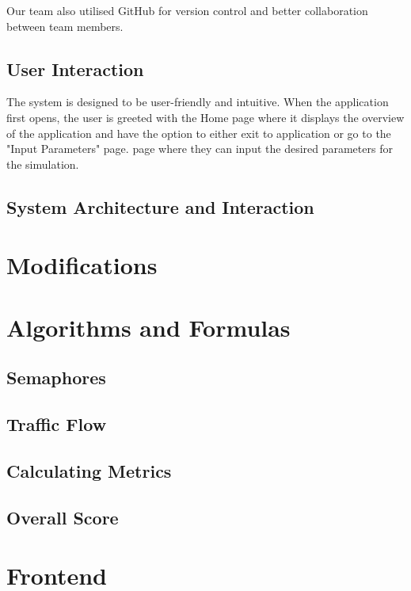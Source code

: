 \documentclass{article}
\begin{document}
    Our team also utilised GitHub for version control and better collaboration between team members.

    \subsection{User Interaction}

    The system is designed to be user-friendly and intuitive. When the application first opens, the user is greeted with the Home page where it displays the overview of the application and have the option to either exit to application or go to the "Input Parameters" page.
    page where they can input the desired parameters for the simulation.

    \subsection{System Architecture and Interaction}


    \section{Modifications}


    \section{Algorithms and Formulas}

    \subsection{Semaphores}

    \subsection{Traffic Flow}

    \subsection{Calculating Metrics}

    \subsection{Overall Score}


    \section{Frontend}
\end{document}
